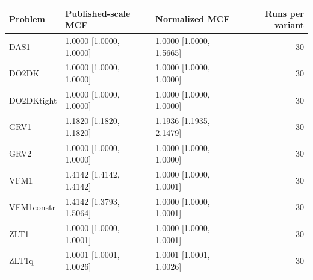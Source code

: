 \begin{tabular}{lllr}
\toprule
Problem & Published-scale MCF & Normalized MCF & Runs per variant \\
\midrule
DAS1 & 1.0000 [1.0000, 1.0000] & 1.0000 [1.0000, 1.5665] & 30 \\
DO2DK & 1.0000 [1.0000, 1.0000] & 1.0000 [1.0000, 1.0000] & 30 \\
DO2DKtight & 1.0000 [1.0000, 1.0000] & 1.0000 [1.0000, 1.0000] & 30 \\
GRV1 & 1.1820 [1.1820, 1.1820] & 1.1936 [1.1935, 2.1479] & 30 \\
GRV2 & 1.0000 [1.0000, 1.0000] & 1.0000 [1.0000, 1.0000] & 30 \\
VFM1 & 1.4142 [1.4142, 1.4142] & 1.0000 [1.0000, 1.0001] & 30 \\
VFM1constr & 1.4142 [1.3793, 1.5064] & 1.0000 [1.0000, 1.0001] & 30 \\
ZLT1 & 1.0000 [1.0000, 1.0001] & 1.0000 [1.0000, 1.0001] & 30 \\
ZLT1q & 1.0001 [1.0001, 1.0026] & 1.0001 [1.0001, 1.0026] & 30 \\
\bottomrule
\end{tabular}
